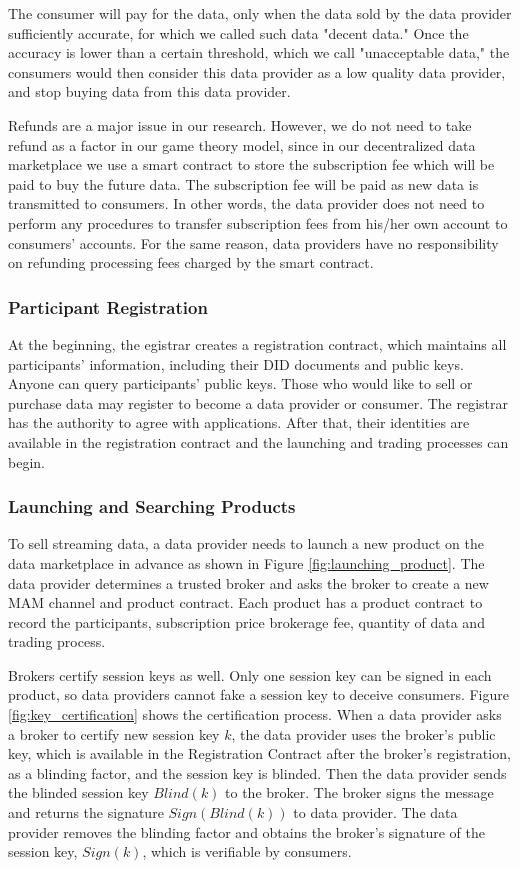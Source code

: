 \documentclass[journal,article,submit,moreauthors,pdftex]{Definitions/mdpi}
\begin{document}
The consumer will pay for the data, only when the data sold by the data provider sufficiently accurate, for which we called such data "decent data."
Once the accuracy is lower than a certain threshold, which we call "unacceptable data," the consumers would then consider this data provider as a low quality data provider, and stop buying data from this data provider.

Refunds are a major issue in our research. However, we do not need to take refund as a factor in our game theory model, since in our decentralized data marketplace we use a smart contract to store the subscription fee which will be paid to buy the future data. The subscription fee will be paid as new data is transmitted to consumers. In other words, the data provider does not need to perform any procedures to transfer subscription fees from his/her own account to consumers' accounts. For the same reason, data providers have no responsibility on refunding processing fees charged by the smart contract.

\subsubsection{Participant Registration}
At the beginning, the egistrar creates a registration contract, which maintains all participants' information, including their DID documents and public keys. Anyone can query participants' public keys. Those who would like to sell or purchase data may register to become a data provider or consumer. The registrar has the authority to agree with applications. After that, their identities are available in the registration contract and the launching and trading processes can begin.

\subsubsection{Launching and Searching Products}
To sell streaming data, a data provider needs to launch a new product on the data marketplace in advance as shown in Figure \ref{fig:launching_product}. The data provider determines a trusted broker and asks the broker to create a new MAM channel and product contract. Each product has a product contract to record the participants, subscription price brokerage fee, quantity of data and  trading process.

Brokers certify session keys as well. Only one session key can be signed in each product, so data providers cannot fake a session key to deceive consumers. Figure \ref{fig:key_certification} shows the certification process. When a data provider asks a broker to certify new session key $k$, the data provider uses the broker's public key, which is available in the Registration Contract after the broker's registration, as a blinding factor, and the session key is blinded. Then the data provider sends the blinded session key $Blind(k)$ to the broker. The broker signs the message and returns the signature $Sign(Blind(k))$ to data provider. The data provider removes the blinding factor and obtains the broker's signature of the session key, $Sign(k)$, which is verifiable by consumers.
\end{document}
